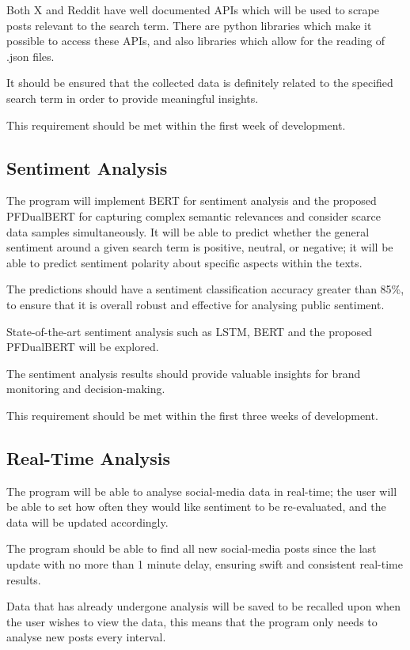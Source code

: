     Both X and Reddit have well documented APIs which will be used to scrape posts relevant to the search term. There are python libraries which make it possible to access these APIs, and also libraries which allow for the reading of .json files.

    It should be ensured that the collected data is definitely related to the specified search term in order to provide meaningful insights.

    This requirement should be met within the first week of development.

    \subsection{Sentiment Analysis}
    The program will implement BERT for sentiment analysis and the proposed PFDualBERT for capturing complex semantic relevances and consider scarce data samples simultaneously. It will be able to predict whether the general sentiment around a given search term is positive, neutral, or negative; it will be able to predict sentiment polarity about specific aspects within the texts.

    The predictions should have a sentiment classification accuracy greater than 85\%, to ensure that it is overall robust and effective for analysing public sentiment.

    State-of-the-art sentiment analysis such as LSTM, BERT and the proposed PFDualBERT will be explored.

    The sentiment analysis results should provide valuable insights for brand monitoring and decision-making.

    This requirement should be met within the first three weeks of development.

    \subsection{Real-Time Analysis}
    The program will be able to analyse social-media data in real-time; the user will be able to set how often they would like sentiment to be re-evaluated, and the data will be updated accordingly.

    The program should be able to find all new social-media posts since the last update with no more than 1 minute delay, ensuring swift and consistent real-time results.

    Data that has already undergone analysis will be saved to be recalled upon when the user wishes to view the data, this means that the program only needs to analyse new posts every interval.

